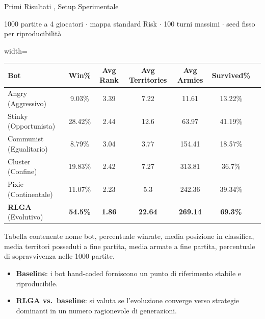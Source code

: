 \documentclass[9pt,serif,usenames,dvipsnames]{beamer}
\begin{document}
	\begin{frame}{\centering Primi Risultati , Setup Sperimentale}

		\begin{center}
			\small
			1000 partite a 4 giocatori $\cdot$ mappa standard Risk $\cdot$
			100 turni massimi $\cdot$ seed fisso per riproducibilità
		\end{center}

		\vspace{0.2cm}

		\begin{adjustbox}{width=\textwidth}
			\small
			\renewcommand{\arraystretch}{1.25}
			\begin{tabular}{lcccccc}
				\toprule
				\textbf{Bot} & \textbf{Win\%} & \textbf{Avg Rank} & \textbf{Avg Territories}
				& \textbf{Avg Armies} & \textbf{Survived\%}\\
				\midrule
				Angry  (Aggressivo)   & 9.03\%  & 3.39 & 7.22  & 11.61  & 13.22\% \\
				Stinky (Opportunista) & 28.42\% & 2.44 & 12.6  & 63.97  & 41.19\% \\
				Communist (Egualitario)& 8.79\% & 3.04 & 3.77  & 154.41 & 18.57\% \\
				Cluster (Confine)     & 19.83\% & 2.42 & 7.27  & 313.81 & 36.7\%  \\
				Pixie (Continentale)  & 11.07\% & 2.23 & 5.3   & 242.36 & 39.34\% \\
				\textbf{RLGA} (Evolutivo) & \textbf{54.5\%} & \textbf{1.86} & \textbf{22.64} & \textbf{269.14} & \textbf{69.3\%}\\
				\bottomrule
			\end{tabular}
		\end{adjustbox}

		\begin{flushleft}
			\tiny Tabella contenente nome bot, percentuale winrate, media posizione in classifica,
			media territori posseduti a fine partita, media armate a fine partita,
			percentuale di sopravvivenza nelle 1000 partite.
		\end{flushleft}

		\vspace{0.2cm}
		\begin{itemize}
			\item<1-> \textbf{Baseline}: i bot hand-coded forniscono un punto di
			riferimento stabile e riproducibile.
			\item<2-> \textbf{RLGA vs.\ baseline}: si valuta se l'evoluzione converge
			verso strategie dominanti in un numero ragionevole di generazioni.
		\end{itemize}
	\end{frame}
\end{document}
